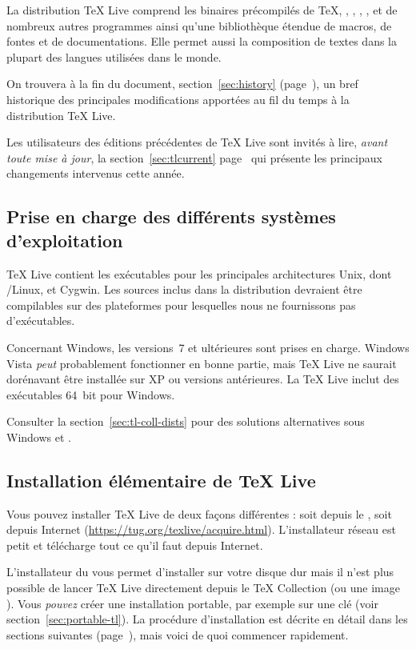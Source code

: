 \documentclass[german, english, french, 12pt]{article}
\renewcommand{\TL}{\TeX{} Live\xspace}%
\renewcommand{\TK}{\TeX{} Collection\xspace}%
\def\p.{page~}
\begin{document}
La distribution \TL{} comprend les binaires précompilés de \TeX, \LaTeXe,
\ConTeXt, \MF, \MP, \BibTeX{} et de nombreux autres programmes ainsi qu'une
bibliothèque étendue de macros, de fontes et de documentations. Elle permet
aussi la composition de textes dans la plupart des langues utilisées dans le
monde.

On trouvera à la fin du document, section~\ref{sec:history}
(page~\pageref{sec:history}), un bref historique des principales modifications
apportées au fil du temps à la distribution \TL{}.

Les utilisateurs des éditions précédentes de \TL{} sont invités à lire,
\emph{avant toute mise à jour}, la section~\ref{sec:tlcurrent}
page~\pageref{sec:tlcurrent} qui présente les principaux changements intervenus
cette année.

\subsection{Prise en charge des différents systèmes d'exploitation}
\label{sec:os-support}

\TL{} contient les exécutables pour les principales architectures Unix, dont
\GNU/Linux, \macOS et Cygwin. Les sources inclus dans la distribution devraient
être compilables sur des plateformes pour lesquelles nous ne fournissons pas
d'exécutables.

Concernant Windows, les versions~7 et ultérieures sont prises en charge.
Windows Vista \emph{peut} probablement fonctionner en bonne partie, mais \TL{}
ne saurait dorénavant être installée sur XP ou versions antérieures.  La \TL{}
inclut des exécutables 64~bit pour Windows.

Consulter la section~\ref{sec:tl-coll-dists} pour des solutions alternatives
sous Windows et \macOS.

\subsection{Installation élémentaire de \protect\TL{}}
\label{sec:basic}

Vous pouvez installer \TL{} de deux façons différentes : soit depuis le \DVD,
soit depuis Internet (\url{https://tug.org/texlive/acquire.html}).
L'installateur réseau est petit et télécharge tout ce qu'il faut depuis
Internet.

L'installateur du \DVD vous permet d'installer sur votre disque dur mais il
n'est plus possible de lancer \TL{} directement depuis le \DVD{} \TK{} (ou une
image ). Vous \emph{pouvez} créer une installation portable, par
exemple sur une clé \USB{} (voir section~\ref{sec:portable-tl}). La procédure
d'installation est décrite en détail dans les sections suivantes
(\p.\pageref{sec:install}), mais voici de quoi commencer rapidement.
\end{document}
